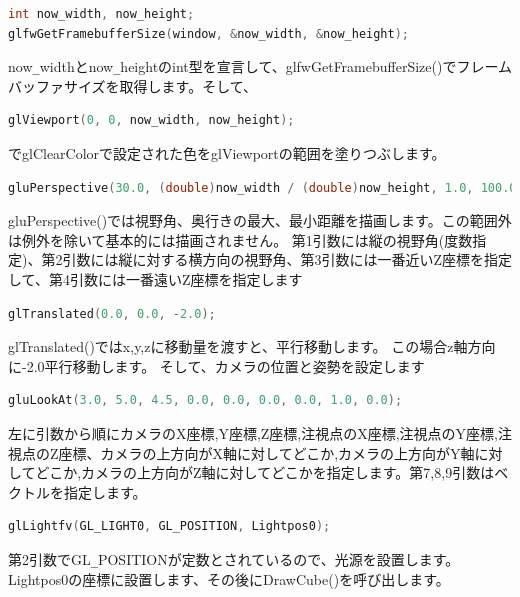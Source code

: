 \documentclass[a4paper,titlepage,dvipdfmx]{jsarticle}
\begin{document}
\begin{lstlisting}[language=C++]
int now_width, now_height;
glfwGetFramebufferSize(window, &now_width, &now_height);
\end{lstlisting}
now\verb|_|widthとnow\verb|_|heightのint型を宣言して、glfwGetFramebufferSize()でフレームバッファサイズを取得します。そして、
\begin{lstlisting}[language=C++]
glViewport(0, 0, now_width, now_height);
\end{lstlisting}
でglClearColorで設定された色をglViewportの範囲を塗りつぶします。
\begin{lstlisting}[language=C++]
gluPerspective(30.0, (double)now_width / (double)now_height, 1.0, 100.0);
\end{lstlisting}
gluPerspective()では視野角、奥行きの最大、最小距離を描画します。この範囲外は例外を除いて基本的には描画されません。
第1引数には縦の視野角(度数指定)、第2引数には縦に対する横方向の視野角、第3引数には一番近いZ座標を指定して、第4引数には一番遠いZ座標を指定します
\begin{lstlisting}[language=C++]
glTranslated(0.0, 0.0, -2.0);
\end{lstlisting}
glTranslated()ではx,y,zに移動量を渡すと、平行移動します。
この場合z軸方向に-2.0平行移動します。
そして、カメラの位置と姿勢を設定します
\begin{lstlisting}[language=C++]
gluLookAt(3.0, 5.0, 4.5, 0.0, 0.0, 0.0, 0.0, 1.0, 0.0);
\end{lstlisting}
左に引数から順にカメラのX座標,Y座標,Z座標,注視点のX座標,注視点のY座標,注視点のZ座標、カメラの上方向がX軸に対してどこか,カメラの上方向がY軸に対してどこか,カメラの上方向がZ軸に対してどこかを指定します。第7,8,9引数はベクトルを指定します。
\begin{lstlisting}[language=C++]
glLightfv(GL_LIGHT0, GL_POSITION, Lightpos0);
\end{lstlisting}
第2引数でGL\verb|_|POSITIONが定数とされているので、光源を設置します。Lightpos0の座標に設置します、その後にDrawCube()を呼び出します。
\end{document}
